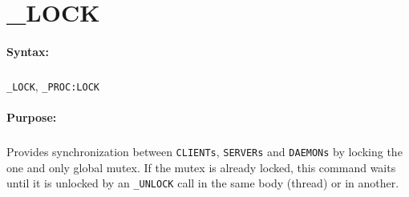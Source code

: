 
\newpage
\section{\_LOCK}
\label{cmd:_LOCK}

\paragraph{Syntax:}
\subparagraph{}
\texttt{\_LOCK}, \texttt{\_PROC:LOCK}

\paragraph{Purpose:}
\subparagraph{}
Provides synchronization between \texttt{CLIENTs}, \texttt{SERVERs}
and \texttt{DAEMONs} by locking the one and only global mutex.
If the mutex is already locked, this command waits until it is unlocked by an
\texttt{\_UNLOCK} call in the same body (thread) or in another.


